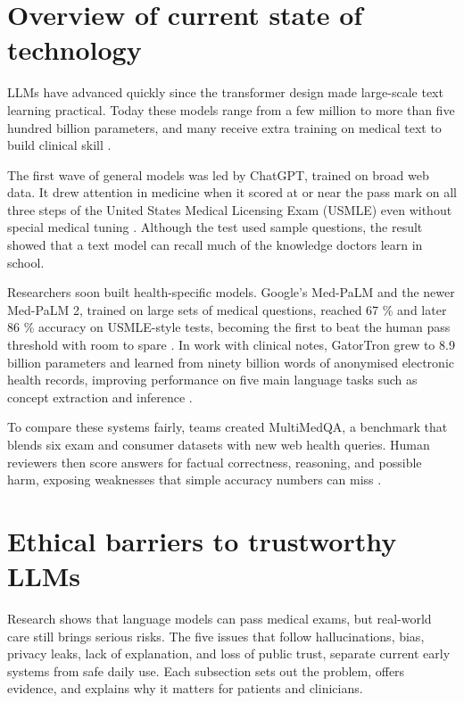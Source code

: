 \documentclass[12pt,a4paper]{scrreprt}
\begin{document}
\section*{Overview of current state of technology}
LLMs have advanced quickly since the transformer design made large-scale text learning practical. Today these models range from a few million to more than five hundred billion parameters, and many receive extra training on medical text to build clinical skill \autocite{Survey}.\par
\vspace{\baselineskip}
\noindent
The first wave of general models was led by ChatGPT, trained on broad web data. It drew attention in medicine when it scored at or near the pass mark on all three steps of the United States Medical Licensing Exam (USMLE) even without special medical tuning \autocite{ChatGPT}. Although the test used sample questions, the result showed that a text model can recall much of the knowledge doctors learn in school.\par
\vspace{\baselineskip}
\noindent
Researchers soon built health-specific models. Google’s Med-PaLM and the newer Med-PaLM 2, trained on large sets of medical questions, reached 67 \% and later 86 \% accuracy on USMLE-style tests, becoming the first to beat the human pass threshold with room to spare \autocite{MedPalm}. In work with clinical notes, GatorTron grew to 8.9 billion parameters and learned from ninety billion words of anonymised electronic health records, improving performance on five main language tasks such as concept extraction and inference \autocite{LLM}.\par
\vspace{\baselineskip}
\noindent
To compare these systems fairly, teams created MultiMedQA, a benchmark that blends six exam and consumer datasets with new web health queries. Human reviewers then score answers for factual correctness, reasoning, and possible harm, exposing weaknesses that simple accuracy numbers can miss \autocite{LLM2}.

\section*{Ethical barriers to trustworthy LLMs}
Research shows that language models can pass medical exams, but real-world care still brings serious risks. The five issues that follow hallucinations, bias, privacy leaks, lack of explanation, and loss of public trust, separate current early systems from safe daily use. Each subsection sets out the problem, offers evidence, and explains why it matters for patients and clinicians.
\end{document}
